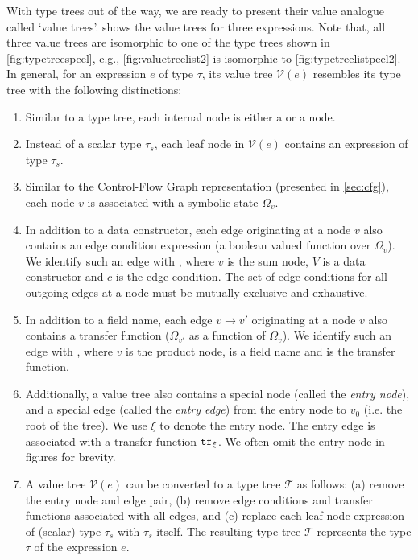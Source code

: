 

With type trees out of the way, we are ready to present their value analogue called `value trees'.
 shows the value trees for three  expressions.
Note that, all three value trees are isomorphic to one of the
 type trees shown in \cref{fig:typetreespeel}, e.g.,
\cref{fig:valuetreelist2} is isomorphic to \cref{fig:typetreelistpeel2}.
In general, for an expression $e$ of type $\tau$, its value tree $\mathcal{V}(e)$ resembles
its type tree with the following distinctions:

\begin{enumerate}
\item Similar to a type tree, each internal node is either a \sumn{} or a \prodn{} node.
\item Instead of a scalar type $\tau_s$, each leaf node in $\mathcal{V}(e)$ contains an expression
of type $\tau_s$.
\item Similar to the Control-Flow Graph representation (presented in \cref{sec:cfg}), each node $v$
is associated with a symbolic state $\Omega_v$.
\item In addition to a data constructor, each edge originating at a \sumn{} node $v$ also contains
an edge condition expression (a boolean valued function over $\Omega_v$).
We identify such an edge with , where $v$ is the sum node,
$V$ is a data constructor and $c$ is the edge condition.
The set of edge conditions for all outgoing edges at a \sumn{} node must be mutually exclusive and exhaustive.
\item In addition to a field name, each edge $v \rightarrow v'$ originating at a \prodn{} node $v$ also contains
a transfer function ($\Omega_{v'}$ as a function of $\Omega_v$).
We identify such an edge with , where $v$ is the product node,
 is a field name and \xfer{} is the transfer function.
\item Additionally, a value tree also contains a special node (called the {\em entry node}), and a special edge
(called the {\em entry edge}) from the entry node to $v_0$ (i.e. the root of the tree).
We use $\xi$ to denote the entry node.
The entry edge is associated with a transfer function ${\tt tf}{}_\xi$.
We often omit the entry node in figures for brevity.
\item A value tree $\mathcal{V}(e)$ can be converted to a type tree $\mathcal{T}$ as follows:
(a) remove the entry node and edge pair, (b) remove edge conditions and transfer functions
associated with all edges, and (c) replace each leaf node expression of (scalar) type $\tau_s$
with $\tau_s$ itself.
The resulting type tree $\mathcal{T}$ represents the type $\tau$ of the expression $e$.
\end{enumerate}

